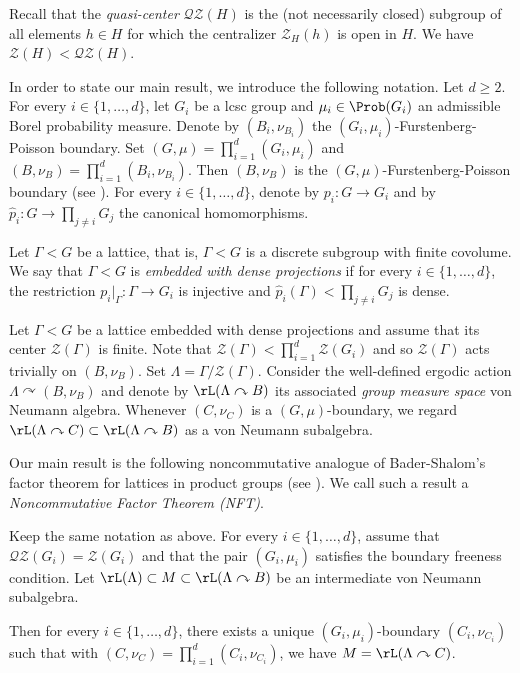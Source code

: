 Recall that the \emph{quasi-center} $\mathscr{Q}\mathscr{Z}(H)$ is the (not necessarily closed) subgroup of all elements $h \in H$ for which the centralizer $\mathscr Z_H(h)$ is open in $H$. We have $\mathscr Z(H) < \mathscr{Q}\mathscr{Z}(H)$.

In order to state our main result, we introduce the following notation. Let $d \geq 2$. For every $i \in \{1, \dots, d\}$, let $G_i$ be a lcsc group and $\mu_i \in \Prob(G_i)$ an admissible Borel probability measure. Denote by $(B_i, \nu_{B_i})$ the $(G_i, \mu_i)$-Furstenberg-Poisson boundary. Set $(G, \mu) = \prod_{i = 1}^d (G_i, \mu_i)$ and $(B, \nu_B) = \prod_{i = 1}^d (B_i, \nu_{B_i})$. Then $(B, \nu_B)$ is the $(G, \mu)$-Furstenberg-Poisson boundary (see \cite[Cor.\,3.2]{BS04}). For every $i \in \{1, \dots, d\}$, denote by $p_i : G \to G_i$ and by $\widehat p_i : G \to \prod_{j \neq i} G_j$ the canonical homomorphisms.

\begin{definition}
Let $\Gamma < G$ be a lattice, that is, $\Gamma < G$ is a discrete subgroup with finite covolume. We say that $\Gamma < G$ is \emph{embedded with dense projections} if for every $i \in \{1, \dots, d\}$, the restriction $p_i|_\Gamma : \Gamma \to G_i$ is injective and $\widehat p_i(\Gamma) < \prod_{j \neq i} G_j$ is dense.
\end{definition}

Let $\Gamma < G$ be a lattice embedded with dense projections and assume that its center $\mathscr Z(\Gamma)$ is finite. Note that $\mathscr Z(\Gamma) < \prod_{i = 1}^d \mathscr Z(G_i)$ and so $\mathscr Z(\Gamma)$ acts trivially on $(B, \nu_B)$. Set $\Lambda = \Gamma/\mathscr Z(\Gamma)$. Consider the well-defined ergodic action $\Lambda \curvearrowright (B, \nu_B)$ and denote by $\rL(\Lambda \curvearrowright B)$ its associated \emph{group measure space} von Neumann algebra. Whenever $(C, \nu_C)$ is a $(G, \mu)$-boundary, we regard $\rL(\Lambda \curvearrowright C) \subset \rL(\Lambda \curvearrowright B)$ as a von Neumann subalgebra.

Our main result is the following noncommutative analogue of Bader-Shalom's factor theorem for lattices in product groups (see \cite[Th.\,1.7]{BS04}). We call such a result a \emph{Noncommutative Factor Theorem (NFT)}.

\begin{letterthm}\label{thmA}
Keep the same notation as above. For every $i \in \{1, \dots, d\}$, assume that $\mathscr{Q}\mathscr{Z}(G_i) = \mathscr Z(G_i)$ and that the pair $(G_i, \mu_i)$ satisfies the boundary freeness condition. Let $\rL(\Lambda) \subset M \subset \rL(\Lambda \curvearrowright B)$ be an intermediate von Neumann subalgebra.

Then for every $i \in \{1, \dots, d\}$, there exists a unique $(G_i, \mu_i)$-boundary $(C_i, \nu_{C_i})$ such that with $(C, \nu_C) = \prod_{i = 1}^d (C_i, \nu_{C_i})$, we have $M = \rL(\Lambda \curvearrowright C)$.
\end{letterthm}

